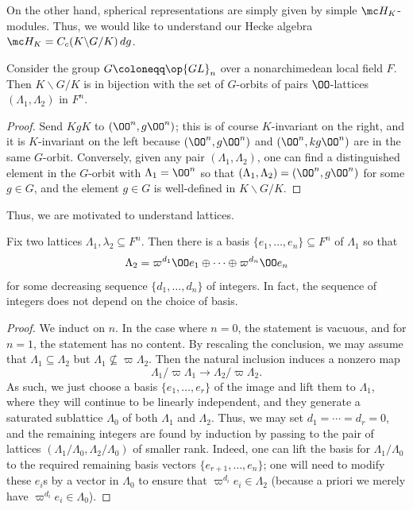 \documentclass[../notes.tex]{subfiles}
\begin{document}
On the other hand, spherical representations are simply given by simple $\mc H_K$-modules. Thus, we would like to understand our Hecke algebra $\mc H_K=C_c(K\backslash G/K)\,dg$.
\begin{lemma} \label{lem:k-coset-to-lattice}
	Consider the group $G\coloneqq\op{GL}_n$ over a nonarchimedean local field $F$. Then $K\backslash G/K$ is in bijection with the set of $G$-orbits of pairs $\OO$-lattices $(\Lambda_1,\Lambda_2)$ in $F^n$.
\end{lemma}
\begin{proof}
	Send $KgK$ to $(\OO^n,g\OO^n)$; this is of course $K$-invariant on the right, and it is $K$-invariant on the left because $(\OO^n,g\OO^n)$ and $(\OO^n,kg\OO^n)$ are in the same $G$-orbit. Conversely, given any pair $(\Lambda_1,\Lambda_2)$, one can find a distinguished element in the $G$-orbit with $\Lambda_1=\OO^n$ so that $(\Lambda_1,\Lambda_2)=(\OO^n,g\OO^n)$ for some $g\in G$, and the element $g\in G$ is well-defined in $K\backslash G/K$.
\end{proof}
Thus, we are motivated to understand lattices.
\begin{proposition} \label{prop:classify-lattice-pairs}
	Fix two lattices $\Lambda_1,\lambda_2\subseteq F^n$. Then there is a basis $\{e_1,\ldots,e_n\}\subseteq F^n$ of $\Lambda_1$ so that
	\[\Lambda_2=\varpi^{d_1}\OO e_1\oplus\cdots\oplus\varpi^{d_n}\OO e_n\]
	for some decreasing sequence $\{d_1,\ldots,d_n\}$ of integers. In fact, the sequence of integers does not depend on the choice of basis.
\end{proposition}
\begin{proof}
	We induct on $n$. In the case where $n=0$, the statement is vacuous, and for $n=1$, the statement has no content. By rescaling the conclusion, we may assume that $\Lambda_1\subseteq\Lambda_2$ but $\Lambda_1\not\subseteq\varpi\Lambda_2$. Then the natural inclusion induces a nonzero map
	\[\Lambda_1/\varpi\Lambda_1\to\Lambda_2/\varpi\Lambda_2.\]
	As such, we just choose a basis $\{e_1,\ldots,e_r\}$ of the image and lift them to $\Lambda_1$, where they will continue to be linearly independent, and they generate a saturated sublattice $\Lambda_0$ of both $\Lambda_1$ and $\Lambda_2$. Thus, we may set $d_1=\cdots=d_r=0$, and the remaining integers are found by induction by passing to the pair of lattices $(\Lambda_1/\Lambda_0,\Lambda_2/\Lambda_0)$ of smaller rank. Indeed, one can lift the basis for $\Lambda_1/\Lambda_0$ to the required remaining basis vectors $\{e_{r+1},\ldots,e_n\}$; one will need to modify these $e_i$s by a vector in $\Lambda_0$ to ensure that $\varpi^{d_i}e_i\in\Lambda_2$ (because a priori we merely have $\varpi^{d_i}e_i\in\Lambda_0$).
\end{proof}
\end{document}
